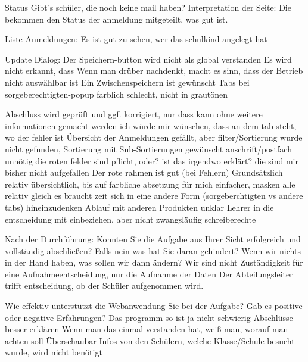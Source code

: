 Status
Gibt's schüler, die noch keine mail haben?
Interpretation der Seite: Die bekommen den Status der anmeldung mitgeteilt, was gut ist. 

Liste Anmeldungen:
Es ist gut zu sehen, wer das schulkind angelegt hat

Update Dialog:
Der Speichern-button wird nicht als global verstanden
Es wird nicht erkannt, dass 
Wenn man drüber nachdenkt, macht es sinn, dass der Betrieb nicht auswählbar ist
Ein Zwischenspeichern ist gewünscht
Tabs bei sorgeberechtigten-popup farblich schlecht, nicht in grautönen

Abschluss wird geprüft und ggf. korrigiert, nur dass kann ohne weitere informationen gemacht werden
ich würde mir wünschen, dass an dem tab steht, wo der fehler ist
Übersicht der Anmeldungen gefällt, aber filter/Sortierung wurde nicht gefunden, Sortierung mit Sub-Sortierungen gewünscht
anschrift/postfach unnötig
die roten felder sind pflicht, oder? ist das irgendwo erklärt? die sind mir bisher nicht aufgefallen
Der rote rahmen ist gut (bei Fehlern)
Grundsätzlich relativ übersichtlich, bis auf farbliche absetzung
für mich einfacher,
masken alle relativ gleich
es braucht zeit sich in eine andere Form (sorgeberchtigten vs andere tabs) hineinzudenken
Ablauf mit anderen Produkten unklar
Lehrer in die entscheidung mit einbeziehen, aber nicht zwangsläufig schreiberechte






Nach der Durchführung:						
Konnten Sie die Aufgabe aus Ihrer Sicht erfolgreich und vollständig abschließen? Falls nein was hat Sie daran gehindert?
Wenn wir nichts in der Hand haben, was sollen wir dann ändern?
Wir sind nicht Zuständigkeit für eine Aufnahmeentscheidung, nur die Aufnahme der Daten
Der Abteilungsleiter trifft entscheidung, ob der Schüler aufgenommen wird.












Wie effektiv unterstützt die Webanwendung Sie bei der Aufgabe? Gab es positive oder negative Erfahrungen?
Das programm so ist ja nicht schwierig
Abschlüsse besser erklären
Wenn man das einmal verstanden hat, weiß man, worauf man achten soll
Überschaubar
Infos von den Schülern, welche Klasse/Schule besucht wurde, wird nicht benötigt









